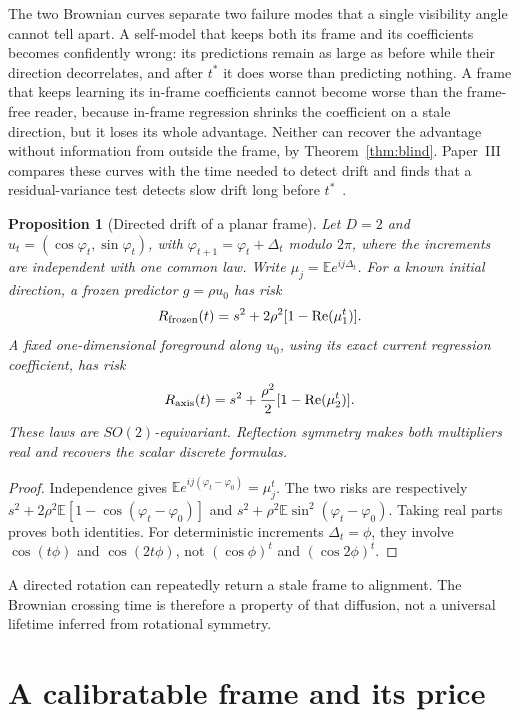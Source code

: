 \documentclass[12pt]{article}
\newtheorem{proposition}[theorem]{Proposition}
\theoremstyle{definition}
\newcommand{\E}{\mathbb E}
\begin{document}
The two Brownian curves separate two failure modes that a single visibility angle cannot tell apart. A self-model that keeps both its frame and its coefficients becomes confidently wrong: its predictions remain as large as before while their direction decorrelates, and after $t^*$ it does worse than predicting nothing. A frame that keeps learning its in-frame coefficients cannot become worse than the frame-free reader, because in-frame regression shrinks the coefficient on a stale direction, but it loses its whole advantage. Neither can recover the advantage without information from outside the frame, by Theorem~\ref{thm:blind}. Paper~III compares these curves with the time needed to detect drift and finds that a residual-variance test detects slow drift long before $t^*$~\cite{Liu2026TDOME_III}.

\begin{proposition}[Directed drift of a planar frame]
\label{prop:planar-drift}
Let $D=2$ and $u_t=(\cos\varphi_t,\sin\varphi_t)$, with
$\varphi_{t+1}=\varphi_t+\Delta_t$ modulo $2\pi$, where the increments are
independent with one common law. Write $\mu_j=\E e^{ij\Delta_t}$.
For a known initial direction, a frozen predictor $g=\rho u_0$ has risk
\[
 R_{\rm frozen}(t)=s^2+2\rho^2[1-\operatorname{Re}(\mu_1^t)].
\]
A fixed one-dimensional foreground along $u_0$, using its exact
current regression coefficient, has risk
\[
 R_{\rm axis}(t)=s^2+\frac{\rho^2}{2}
                    [1-\operatorname{Re}(\mu_2^t)].
\]
These laws are $SO(2)$-equivariant. Reflection symmetry makes both
multipliers real and recovers the scalar discrete formulas.
\end{proposition}
\begin{proof}
Independence gives
$\E e^{ij(\varphi_t-\varphi_0)}=\mu_j^t$.
The two risks are respectively
$s^2+2\rho^2\E[1-\cos(\varphi_t-\varphi_0)]$ and
$s^2+\rho^2\E\sin^2(\varphi_t-\varphi_0)$.
Taking real parts proves both identities. For deterministic increments
$\Delta_t=\phi$, they involve $\cos(t\phi)$ and $\cos(2t\phi)$,
not $(\cos\phi)^t$ and $(\cos2\phi)^t$.
\end{proof}

A directed rotation can repeatedly return a stale frame to alignment.
The Brownian crossing time is therefore a property of that diffusion,
not a universal lifetime inferred from rotational symmetry.

\section{A calibratable frame and its price}
\label{sec:calibration}
\end{document}

